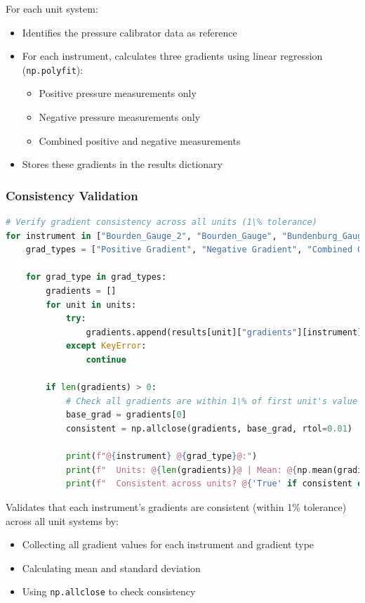 \documentclass{article}
\begin{document}
For each unit system:
\begin{itemize}
	\item Identifies the pressure calibrator data as reference
	\item For each instrument, calculates three gradients using linear regression (\texttt{np.polyfit}):
	\begin{itemize}
		\item Positive pressure measurements only
		\item Negative pressure measurements only
		\item Combined positive and negative measurements
	\end{itemize}
	\item Stores these gradients in the results dictionary
\end{itemize}

\subsubsection{Consistency Validation}
\begin{lstlisting}[language=Python,escapechar=@]
# Verify gradient consistency across all units (1\% tolerance)
for instrument in ["Bourden_Gauge_2", "Bourden_Gauge", "Bundenburg_Gauge", "Hg_Glass"]:
	grad_types = ["Positive Gradient", "Negative Gradient", "Combined Gradient"]

	for grad_type in grad_types:
		gradients = []
		for unit in units:
			try:
				gradients.append(results[unit]["gradients"][instrument][grad_type])
			except KeyError:
				continue
	
		if len(gradients) > 0:
			# Check all gradients are within 1\% of first unit's value
			base_grad = gradients[0]
			consistent = np.allclose(gradients, base_grad, rtol=0.01)
		
			print(f"@{instrument} @{grad_type}@:")
			print(f"  Units: @{len(gradients)}@ | Mean: @{np.mean(gradients):.4f}@ $\pm$ @{np.std(gradients):.4f}@")
			print(f"  Consistent across units? @{'True' if consistent else 'False'}@")
\end{lstlisting}

Validates that each instrument's gradients are consistent (within 1\% tolerance) across all unit systems by:
\begin{itemize}
	\item Collecting all gradient values for each instrument and gradient type
	\item Calculating mean and standard deviation
	\item Using \texttt{np.allclose} to check consistency
\end{itemize}
\end{document}

